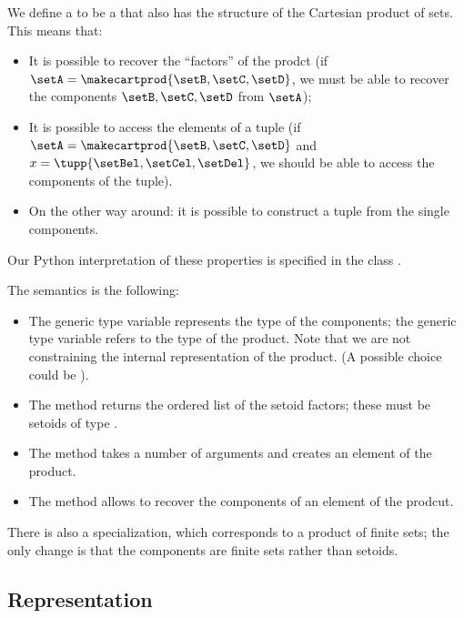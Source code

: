 
We define a  to be a \Setoid that also has the structure of the Cartesian product of sets.
This means that:
\begin{itemize}
    \item It is possible to recover the ``factors'' of the prodct (if $\setA = \makecartprod{\setB, \setC, \setD}$, we must be able to recover the components $\setB, \setC, \setD$ from $\setA$);
    \item It is possible to access the elements of a tuple (if $\setA = \makecartprod{\setB, \setC, \setD}$ and $x = \tupp{\setBel, \setCel, \setDel}$, we should be able to access the components of the tuple).
    \item On the other way around: it is possible to construct a tuple from the single components.
\end{itemize}
Our Python interpretation of these properties is specified in the class .


The semantics is the following:
\begin{itemize}
    \item The generic type variable  represents the type of the components; the generic type variable 
          refers to the type of the product.
          Note that we are not constraining the internal representation of the product.
          (A possible choice could be ).
    \item The method  returns the ordered list of the setoid factors; these must be setoids of type .
    \item The method  takes a number of arguments and creates an element of the product.
    \item The method  allows to recover the components of an element of the prodcut.
\end{itemize}

There is also a specialization, which corresponds to a product of finite sets; the only change is that the components are finite sets rather than setoids.


\clearpage

\subsection{Representation}

